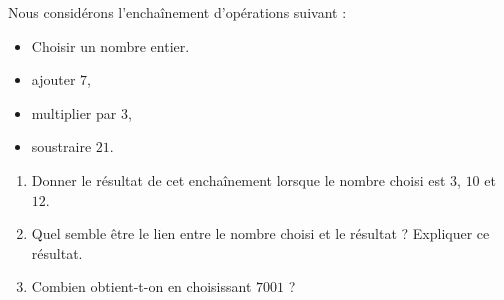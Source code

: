 
\begin{exercice}\label{exosmath-0827}

Nous considérons l'enchaînement d'opérations suivant :
\begin{itemize}
    \item Choisir un nombre entier.
    \item ajouter \( 7\),
    \item multiplier par \( 3\),
    \item soustraire \( 21\).
\end{itemize}
\begin{enumerate}
    \item
        Donner le résultat de cet enchaînement lorsque le nombre choisi est \( 3\), \( 10\) et \( 12\).
    \item
        Quel semble être le lien entre le nombre choisi et le résultat ? Expliquer ce résultat.
    \item
        Combien obtient-t-on en choisissant \( 7001\) ?
\end{enumerate}

\end{exercice}
